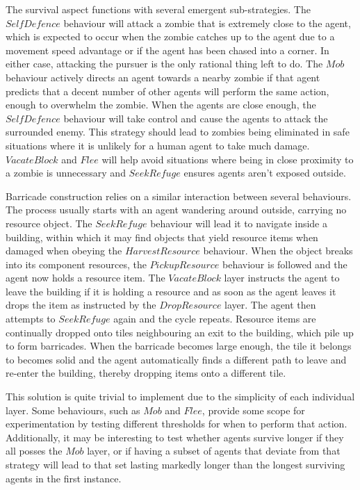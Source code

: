 \documentclass[12pt,a4paper]{article}
\begin{document}
The survival aspect functions with several emergent sub-strategies. The $SelfDefence$ behaviour will attack a zombie that is extremely close to the agent, which is expected to occur when the zombie catches up to the agent due to a movement speed advantage or if the agent has been chased into a corner. In either case, attacking the pursuer is the only rational thing left to do. The $Mob$ behaviour actively directs an agent towards a nearby zombie if that agent predicts that a decent number of other agents will perform the same action, enough to overwhelm the zombie. When the agents are close enough, the $SelfDefence$ behaviour will take control and cause the agents to attack the surrounded enemy. This strategy should lead to zombies being eliminated in safe situations where it is unlikely for a human agent to take much damage. $VacateBlock$ and $Flee$ will help avoid situations where being in close proximity to a zombie is unnecessary and $SeekRefuge$ ensures agents aren't exposed outside.

Barricade construction relies on a similar interaction between several behaviours. The process usually starts with an agent wandering around outside, carrying no resource object. The $SeekRefuge$ behaviour will lead it to navigate inside a building, within which it may find objects that yield resource items when damaged when obeying the $HarvestResource$ behaviour. When the object breaks into its component resources, the $PickupResource$ behaviour is followed and the agent now holds a resource item. The $VacateBlock$ layer instructs the agent to leave the building if it is holding a resource and as soon as the agent leaves it drops the item as instructed by the $DropResource$ layer. The agent then attempts to $SeekRefuge$ again and the cycle repeats. Resource items are continually dropped onto tiles neighbouring an exit to the building, which pile up to form barricades. When the barricade becomes large enough, the tile it belongs to becomes solid and the agent automatically finds a different path to leave and re-enter the building, thereby dropping items onto a different tile.

This solution is quite trivial to implement due to the simplicity of each individual layer. Some behaviours, such as $Mob$ and $Flee$, provide some scope for experimentation by testing different thresholds for when to perform that action. Additionally, it may be interesting to test whether agents survive longer if they all posses the $Mob$ layer, or if having a subset of agents that deviate from that strategy will lead to that set lasting markedly longer than the longest surviving agents in the first instance.
\end{document}
